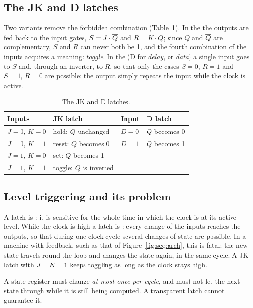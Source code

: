 \subsection{The JK and D latches}

Two variants remove the forbidden combination (Table~\ref{tab:seq:jkd}). In
the  the outputs are fed back to the input gates,
$S=J\cdot\overline{Q}$ and $R=K\cdot Q$; since $Q$ and $\overline{Q}$ are
complementary, $S$ and $R$ can never both be 1, and the fourth combination of
the inputs acquires a meaning: \emph{toggle}. In the  (D for
\emph{delay}, or \emph{data}) a single input goes to $S$ and, through an
inverter, to $R$, so that only the cases $S=0$, $R=1$ and $S=1$, $R=0$ are
possible: the output simply repeats the input while the clock is active.

\begin{table}[htb]
\centering\small
\caption{The JK and D latches.}\label{tab:seq:jkd}
\begin{tabular}{@{}ll@{\qquad\qquad}ll@{}}
\toprule
\textbf{Inputs} & \textbf{JK latch} & \textbf{Input} & \textbf{D latch}\\
\midrule
$J=0$, $K=0$ & hold: $Q$ unchanged & $D=0$ & $Q$ becomes 0\\
$J=0$, $K=1$ & reset: $Q$ becomes 0 & $D=1$ & $Q$ becomes 1\\
$J=1$, $K=0$ & set: $Q$ becomes 1 & &\\
$J=1$, $K=1$ & toggle: $Q$ is inverted & &\\
\bottomrule
\end{tabular}
\end{table}

\subsection{Level triggering and its problem}

A latch is : it is sensitive for the whole time in which
the clock is at its active level. While the clock is high a latch is
: every change of the inputs reaches the outputs, so that
during one clock cycle several changes of state are possible. In a machine
with feedback, such as that of Figure~\ref{fig:seq:arch}, this is fatal: the
new state travels round the loop and changes the state again, in the same
cycle. A JK latch with $J=K=1$ keeps toggling as long as the clock stays
high.

\begin{prgconcept}
A state register must change \emph{at most once per cycle}, and must not let
the next state through while it is still being computed. A transparent latch
cannot guarantee it.
\end{prgconcept}

